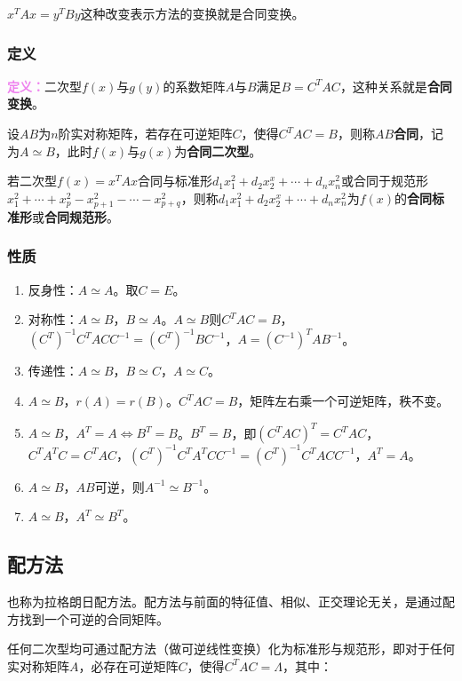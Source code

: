 \documentclass[UTF8, 12pt]{ctexart}
\begin{document}
$x^TAx=y^TBy$这种改变表示方法的变换就是合同变换。

\subsubsection{定义}

\textcolor{violet}{\textbf{定义：}}二次型$f(x)$与$g(y)$的系数矩阵$A$与$B$满足$B=C^TAC$，这种关系就是\textbf{合同变换}。

设$AB$为$n$阶实对称矩阵，若存在可逆矩阵$C$，使得$C^TAC=B$，则称$AB$\textbf{合同}，记为$A\simeq B$，此时$f(x)$与$g(x)$为\textbf{合同二次型}。

若二次型$f(x)=x^TAx$合同与标准形$d_1x_1^2+d_2x_2^x+\cdots+d_nx_n^2$或合同于规范形$x_1^2+\cdots+x_p^2-x_{p+1}^2-\cdots-x_{p+q}^2$，则称$d_1x_1^2+d_2x_2^x+\cdots+d_nx_n^2$为$f(x)$的\textbf{合同标准形}或\textbf{合同规范形}。

\subsubsection{性质}

\begin{enumerate}
    \item 反身性：$A\simeq A$。取$C=E$。
    \item 对称性：$A\simeq B$，$B\simeq A$。$A\simeq B$则$C^TAC=B$，$(C^T)^{-1}C^TACC^{-1}=(C^T)^{-1}BC^{-1}$，$A=(C^{-1})^TAB^{-1}$。
    \item 传递性：$A\simeq B$，$B\simeq C$，$A\simeq C$。
    \item $A\simeq B$，$r(A)=r(B)$。$C^TAC=B$，矩阵左右乘一个可逆矩阵，秩不变。
    \item $A\simeq B$，$A^T=A\Leftrightarrow B^T=B$。$B^T=B$，即$(C^TAC)^T=C^TAC$，$C^TA^TC=C^TAC$，$(C^T)^{-1}C^TA^TCC^{-1}=(C^T)^{-1}C^TACC^{-1}$，$A^T=A$。
    \item $A\simeq B$，$AB$可逆，则$A^{-1}\simeq B^{-1}$。
    \item $A\simeq B$，$A^T\simeq B^T$。
\end{enumerate}

\subsection{配方法}

也称为拉格朗日配方法。配方法与前面的特征值、相似、正交理论无关，是通过配方找到一个可逆的合同矩阵。

任何二次型均可通过配方法（做可逆线性变换）化为标准形与规范形，即对于任何实对称矩阵$A$，必存在可逆矩阵$C$，使得$C^TAC=\Lambda$，其中：
\end{document}

